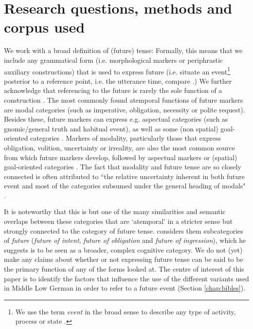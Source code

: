\documentclass[output=paper,colorlinks,citecolor=brown]{langscibook}
\begin{document}
\section{Research questions, methods and corpus used}\label{chap:method}
We work with a broad definition of (future) tense: Formally, this means that we include any grammatical form (i.e. morphological markers or periphrastic auxiliary constructions) that is used to express future (i.e. situate an event\footnote{We use the term \textit{event} in the broad sense to describe any type of activity, process or state \citep[85]{Ultan1978}.} posterior to a reference point, i.e. the utterance time, compare \cite[287--288]{Reichenbach1947}.) We further acknowledge that referencing to the future is rarely the sole function of a construction \citep[52]{comrie_identifying_1989}.
The  most commonly found atemporal functions of future markers are modal categories (such as imperative, obligation, necessity or polite request). Besides these, future markers can express e.g. aspectual categories (such as gnomic/general truth and habitual event), as well as some (non spatial) goal-oriented categories \citep[102--106]{Ultan1978}. Markers of modality, particularly those that express obligation, volition, uncertainty or irreality, are also the most common source from which future markers develop, followed by aspectual markers or (spatial) goal-oriented categories \citep[118]{Ultan1978}. 
The fact that modality and future tense are so closely connected is often attributed to ``the relative uncertainty inherent in both future event and most of the categories subsumed under the general heading of modals"  \citep[118]{Ultan1978}. 

It is noteworthy that this is but one of the many similarities and semantic overlaps between these categories that are `atemporal' in a stricter sense but strongly connected to the category of future tense. \citet[73, 82]{morris1990} considers them subcategories of \textit{future} (\textit{future of intent}, \textit{future of obligation} and \textit{future of ingression}), which he suggests is to be seen as a broader, complex cognitive category. We do not (yet) make any claims about whether or not expressing future tense can be said to be the primary function of any of the forms looked at. The centre of interest of this paper is to identify the factors that influence the use of the different variants used in Middle Low German in order to refer to a future event (Section \ref{chap:bibles}). 
\end{document}
